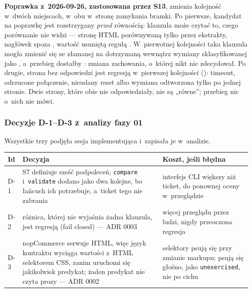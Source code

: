 \textbf{Poprawka z~2026-09-26, zastosowana przez S13}, zmienia kolejność w~dwóch miejscach,
w~obu w~stronę zamykania bramki. Po pierwsze, kandydat na poprawkę jest rozstrzygany
\emph{przed} równością: klauzula może czytać to, czego porównanie nie widzi --- stronę HTML
porównywaną tylko przez ekstrakty, nagłówek spoza , wartość
usuniętą regułą . W~pierwotnej kolejności taka klauzula mogła zmienić się
ze złamanej na dotrzymaną wewnątrz wymiany sklasyfikowanej jako , a~przebieg
dostałby : zmiana zachowania, o~której nikt nie zdecydował. Po drugie, strona
bez odpowiedzi jest regresją w~pierwszej kolejności (): timeout,
odrzucone połączenie, nieudany reset albo wymiana odtworzona tylko po jednej stronie. Dwie
strony, które obie nie odpowiedziały, nie są „równe”; przebieg nic o~nich nie mówi.

\subsubsection{Decyzje D-1–D-3 z~analizy fazy 01}

Wszystkie trzy podjęła sesja implementująca i~zapisała je w~analizie.

{\small
\begin{tabularx}{\linewidth}{@{}l >{\raggedright\arraybackslash}X >{\raggedright\arraybackslash}p{4.4cm}@{}}
\toprule
Id & Decyzja & Koszt, jeśli błędna \\
\midrule
D-1 & S7 definiuje sześć podpoleceń; \texttt{compare} i~\texttt{validate} dodano jako dwa
kolejne, bo łańcuch ich potrzebuje, a~ticket tego nie zabrania & interfejs CLI większy niż
ticket, do ponownej oceny w~przeglądzie \\
D-2 & różnica, której nie wyjaśnia żadna klauzula, jest regresją (fail closed) --- ADR 0003
& więcej przeglądu przez ludzi, nigdy przeoczona regresja \\
D-3 & nopCommerce serwuje HTML, więc język kontraktu wyciąga wartości z~HTML selektorem CSS,
zanim uruchomi się jakikolwiek predykat; żaden predykat nie czyta prozy --- ADR 0002 &
selektory psują się przy zmianie markupu; psują się głośno, jako \texttt{unexercised}, nie po
cichu \\
\bottomrule
\end{tabularx}
}


